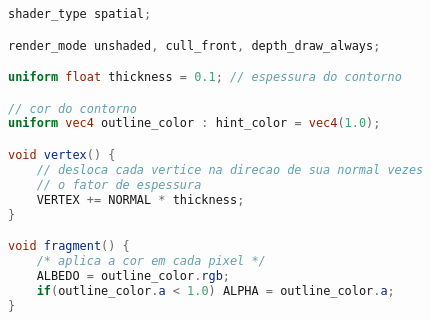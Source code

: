 \label{an:codigo-fonte-contorno-glsl}



\begin{lstlisting}[language=GLSL, caption={\label{cf:outline} Shader GLSL 3D simples para efeito de contorno}]
shader_type spatial;

render_mode unshaded, cull_front, depth_draw_always; 

uniform float thickness = 0.1; // espessura do contorno

// cor do contorno
uniform vec4 outline_color : hint_color = vec4(1.0); 

void vertex() {
    // desloca cada vertice na direcao de sua normal vezes
	// o fator de espessura 
	VERTEX += NORMAL * thickness; 
}

void fragment() {
    /* aplica a cor em cada pixel */
	ALBEDO = outline_color.rgb;
	if(outline_color.a < 1.0) ALPHA = outline_color.a;
}
\end{lstlisting}

\nocite{outlineGLSL}

